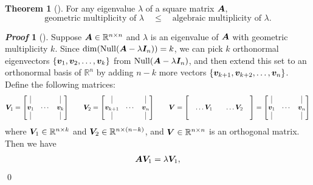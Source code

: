 \documentclass[10pt,UTF8]{article}
\renewcommand*{\vec}{\vectorsym}
\newcommand{\mat}[1]{\matrixsym{#1}}
\newenvironment{theoremBox}
{
  \begin{tcolorbox}[colback=yellow!5!white,colframe=yellow!75!black,parbox=false,before
  upper=\par,before lower=\par]}
  {
\end{tcolorbox}}
\theoremstyle{definition}
\newtheorem{definition inner}{Definition}[section]
\theoremstyle{definition}
\newtheorem{theorem inner}{Theorem}[section]
\newenvironment{theorem}[1][]
{
  \begin{theoremBox}
  \begin{theorem inner}[#1]\hfill\par}
    {
    \end{theorem inner}
\end{theoremBox}}
\theoremstyle{definition}
\newtheorem*{proof inner}{\textit{Proof}}
\renewenvironment{proof}[1][]
{
\begin{proof inner}[#1]\hfill\par}
  {\qed\vphantom{.}
\end{proof inner}}
\theoremstyle{plain}
\newtheorem{tip inner}{Tip}[section]
\theoremstyle{remark}
\DeclareMathOperator{\Null}{Null}  %
\begin{document}
\begin{theorem}
  For any eigenvalue \(\lambda \) of a square matrix \(\mat{A}\),
  \begin{equation*}
    \text{geometric multiplicity of } \lambda
    \quad \leqslant \quad
    \text{algebraic multiplicity of } \lambda.
  \end{equation*}
\end{theorem}
\begin{proof}
  Suppose \(\mat{A} \in \mathbb{R}^{n \times n}\) and \(\lambda \) is
  an eigenvalue of \(\mat{A}\) with geometric multiplicity \(k\).
  Since \(\dim(\Null(\mat{A} - \lambda \mat{I}_n)) = k\),
  we can pick \(k\) orthonormal eigenvectors
  \( \{\vec{v}_1, \vec{v}_2, \ldots, \vec{v}_k\} \) from \(\Null(\mat{A} - \lambda \mat{I}_n)\),
  and then extend this set to an orthonormal basis of \(\mathbb{R}^n\)
  by adding \(n-k\) more vectors
  \( \{\vec{v}_{k+1}, \vec{v}_{k+2}, \ldots, \vec{v}_n\} \).
  Define the following matrices:
  \begin{equation*}
    \mat{V}_1 =
    \begin{bmatrix}
      \vrule & & \vrule \\
      \vec{v}_1 & \cdots & \vec{v}_k \\
      \vrule & & \vrule
    \end{bmatrix}
    \qquad
    \mat{V}_2 =
    \begin{bmatrix}
      \vrule & & \vrule \\
      \vec{v}_{k+1} & \cdots & \vec{v}_n \\
      \vrule & & \vrule
    \end{bmatrix}
    \qquad
    \mat{V} =
    \begin{bmatrix}
      & & & & \\
      & \ldots \mat{V}_1 & & \ldots \mat{V}_2 & \\
      & & & &
    \end{bmatrix} =
    \begin{bmatrix}
      \vrule & & \vrule \\
      \vec{v}_{1} & \cdots & \vec{v}_n \\
      \vrule & & \vrule
    \end{bmatrix}
  \end{equation*}
  where
  \(\mat{V}_1 \in \mathbb{R}^{n \times k} \) and
  \(\mat{V}_2 \in \mathbb{R}^{n \times (n-k)}\),
  and \(\mat{V} \in \mathbb{R}^{n \times n}\) is an orthogonal matrix.
  Then we have
  \begin{align*}
    \mat{A} \mat{V}_1 = \lambda \mat{V}_1,

\end{align*}
\end{proof}
\end{document}
